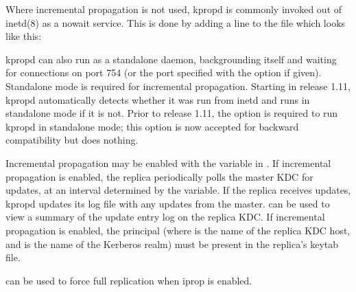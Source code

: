 \documentclass[letterpaper,10pt,english]{sphinxmanual}
\begin{document}
Where incremental propagation is not used, kpropd is commonly invoked
out of inetd(8) as a nowait service.  This is done by adding a line to
the  file which looks like this:

%
\begin{sphinxVerbatim}[commandchars=\\\{\}]
            
\end{sphinxVerbatim}

kpropd can also run as a standalone daemon, backgrounding itself and
waiting for connections on port 754 (or the port specified with the
 option if given).  Standalone mode is required for incremental
propagation.  Starting in release 1.11, kpropd automatically detects
whether it was run from inetd and runs in standalone mode if it is
not.  Prior to release 1.11, the  option is required to run
kpropd in standalone mode; this option is now accepted for backward
compatibility but does nothing.

Incremental propagation may be enabled with the 
variable in {\hyperref[\detokenize{admin/conf_files/kdc_conf:kdc-conf-5}]{}}.  If incremental propagation is
enabled, the replica periodically polls the master KDC for updates, at
an interval determined by the  variable.  If the
replica receives updates, kpropd updates its log file with any updates
from the master.  {\hyperref[\detokenize{admin/admin_commands/kproplog:kproplog-8}]{}} can be used to view a summary of
the update entry log on the replica KDC.  If incremental propagation
is enabled, the principal  (where
 is the name of the replica KDC host, and  is
the name of the Kerberos realm) must be present in the replica’s
keytab file.

{\hyperref[\detokenize{admin/admin_commands/kproplog:kproplog-8}]{}} can be used to force full replication when iprop is
enabled.
\end{document}
